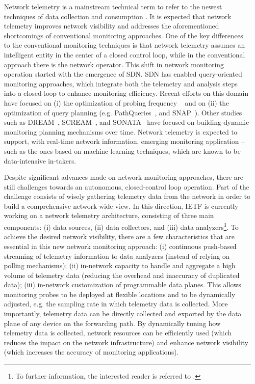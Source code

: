 Network telemetry is a mainstream technical term to refer to the newest techniques of data collection and consumption \cite{rfc-ntf}. It is expected that network telemetry improves network visibility and addresses the aforementioned shortcomings of conventional monitoring approaches. One of the key differences to the conventional monitoring techniques is that network telemetry assumes an intelligent entity in the center of a closed control loop, while in the conventional approach there is the network operator. This shift in network monitoring operation started with the emergence of SDN. SDN has enabled query-oriented monitoring approaches, which integrate both the telemetry and analysis steps into a closed-loop to enhance monitoring efficiency. Recent efforts on this domain have focused on (i) the optimization of probing frequency ~\cite{noms14-payless,im17-DecentralizedMonitoring} and on (ii) the optimization of query planning (e.g. PathQueries~\cite{nsdi16-PathQueries}, and SNAP~\cite{sigcomm16-snap}). Other studies such as DREAM~\cite{sigcomm14-dream}, SCREAM~\cite{conext15-scream}, and SONATA~\cite{sigcomm18-sonata} have focused on building dynamic monitoring planning mechanisms over time. 
%
Network telemetry is expected to support, with real-time network information, emerging monitoring application -- such as the ones based on machine learning techniques, which are known to be data-intensive in-takers.


Despite significant advances made on network monitoring approaches, there are still challenges towards an autonomous, closed-control loop operation. Part of the challenge consists of wisely gathering telemetry data from the network in order to build a comprehensive network-wide view. In this direction, IETF is currently working on a network telemetry architecture, consisting of three main components: (i) data sources, (ii) data collectors, and (iii) data analyzers\footnote{To further information, the interested reader is referred to \cite{rfc-ntf}.}. To achieve the desired network visibility, there are a few characteristics that are essential in this new network monitoring approach: (i) continuous push-based streaming of telemetry information to data analyzers (instead of relying on polling mechanisms); 
%
(ii) in-network capacity to handle and aggregate a high volume of telemetry data (reducing the overhead and inaccuracy of duplicated data); 
%
(iii) in-network customization of programmable data planes. 
%
This allows monitoring probes to be deployed at flexible locations and to be dynamically adjusted, e.g. the sampling rate in which telemetry data is collected. More importantly, telemetry data can be directly collected and exported by the data plane of any device on the forwarding path. By dynamically tuning how telemetry data is collected, network resources can be efficiently used (which reduces the impact on the network infrastructure) and enhance network visibility (which increases the accuracy of monitoring applications). 